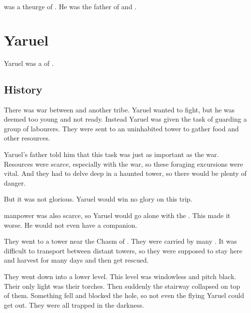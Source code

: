 \section{\Vahaniel}
\index{\Vahaniel}
\Vahaniel was a \resphan theurge of \Merkyrah.
He was the father of  and .















\section{Yaruel}
Yaruel was a \resphan of \Merkyrah. 









\subsection{History}
There was war between \Merkyrah and another tribe. 
Yaruel wanted to fight, but he was deemed too young and not ready. 
Instead Yaruel was given the task of guarding a group of \human labourers.
They were sent to an uninhabited tower to gather food and other resources. 

Yaruel's father told him that this task was just as important as the war.
Resources were scarce, especially with the war, so these foraging excursions were vital. 
And they had to delve deep in a haunted tower, so there would be plenty of danger. 

But it was not glorious.
Yaruel would win no glory on this trip. 

\Resphan manpower was also scarce, so Yaruel would go alone with the \humans.
This made it worse. 
He would not even have a \resphan companion.

They went to a tower near the Chasm of .
They were carried by many \carths.
It was difficult to transport \humans between distant towers, so they were supposed to stay here and harvest for many days and then get rescued. 

They went down into a lower level.
This level was windowless and pitch black.
Their only light was their torches.
Then suddenly the stairway collapsed on top of them.
Something fell and blocked the hole, so not even the flying Yaruel could get out.
They were all trapped in the darkness. 

